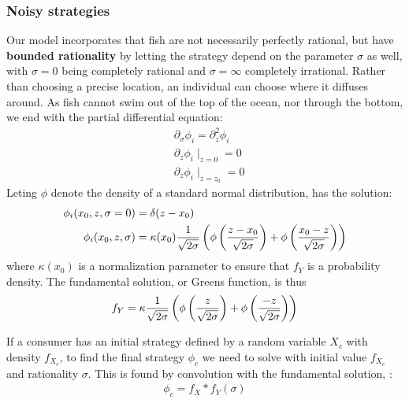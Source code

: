 \subsubsection*{Noisy strategies} %
Our model incorporates that fish are not necessarily perfectly rational, but have \textbf{bounded rationality} by letting the strategy depend on the parameter $\sigma$ as well, with $\sigma=0$ being completely rational and $\sigma = \infty$ completely irrational. Rather than choosing a precise location, an individual can choose where it diffuses around. As fish cannot swim out of the top of the ocean, nor through the bottom, we end with the partial differential equation:
\begin{align}
  \label{eq:density_PDE}
	&\partial_\sigma \phi_i = \partial_z^2 \phi_i \\
	&\partial_z \phi_i \mid_{z=0} = 0 \\
  &\partial_z \phi_i \mid_{z = z_0} = 0
\end{align}
Leting $\phi$ denote the density of a standard normal distribution,  has the solution:
\begin{align}
  \phi_i(x_0,z,\sigma=0) &= \delta(z-x_0) \\
  \phi_i(x_0,z,\sigma) &=\kappa(x_0) \frac{1}{\sqrt{2\sigma}} \pa{\phi\pa{\frac{z-x_0}{\sqrt{2\sigma}}} + \phi\pa{\frac{x_0 - z}{\sqrt{2\sigma}}} }
\end{align}
where $\kappa(x_0)$ is a normalization parameter to ensure that $f_Y$ is a probability density. The fundamental solution, or Greens function, is thus
\begin{align}
  \label{eq:Greens_function}
  f_Y =\kappa \frac{1}{\sqrt{2\sigma}} \pa{\phi\pa{\frac{z}{\sqrt{2\sigma}}} + \phi\pa{\frac{- z}{\sqrt{2\sigma}}} }
\end{align}


If a consumer has an initial strategy defined by a random variable $X_c$ with density $f_{X_c}$, to find the final strategy $\phi_c$ we need to solve  with initial value $f_{X_c}$ and rationality $\sigma$. This is found by convolution with the fundamental solution, :
\begin{align}
  \label{eq:realized_distribution}
	\phi_c = f_X * f_Y(\sigma)
\end{align}


